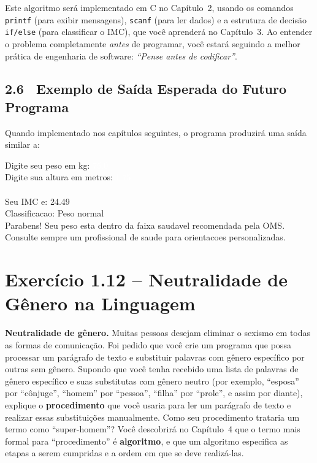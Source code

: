 \documentclass[12pt,a4paper]{article}
\begin{document}
\begin{boaprática}
  Este algoritmo será implementado em C no Capítulo~2, usando os comandos
  \texttt{printf} (para exibir mensagens), \texttt{scanf} (para ler dados) e
  a estrutura de decisão \texttt{if/else} (para classificar o IMC), que você
  aprenderá no Capítulo~3. Ao entender o problema completamente \textit{antes}
  de programar, você estará seguindo a melhor prática de engenharia de software:
  \textit{``Pense antes de codificar''}.
\end{boaprática}

\subsection*{2.6 \ Exemplo de Saída Esperada do Futuro Programa}

Quando implementado nos capítulos seguintes, o programa produzirá uma saída similar a:

\begin{tcolorbox}[colback=black!90, colframe=deitelblue, fontupper=\ttfamily\small\color{green!70}]
Digite seu peso em kg: \textcolor{white}{75.0}\\
Digite sua altura em metros: \textcolor{white}{1.75}\\
\\
Seu IMC e: 24.49\\
Classificacao: Peso normal\\
Parabens! Seu peso esta dentro da faixa saudavel recomendada pela OMS.\\
Consulte sempre um profissional de saude para orientacoes personalizadas.
\end{tcolorbox}

\newpage

\section{Exercício 1.12 -- Neutralidade de Gênero na Linguagem}

\begin{enunciadoBox}[Enunciado]
\textbf{Neutralidade de gênero.} Muitas pessoas desejam eliminar o sexismo em todas
as formas de comunicação. Foi pedido que você crie um programa que possa processar
um parágrafo de texto e substituir palavras com gênero específico por outras sem
gênero. Supondo que você tenha recebido uma lista de palavras de gênero específico
e suas substitutas com gênero neutro (por exemplo, ``esposa'' por ``cônjuge'',
``homem'' por ``pessoa'', ``filha'' por ``prole'', e assim por diante), explique
o \textbf{procedimento} que você usaria para ler um parágrafo de texto e realizar
essas substituições manualmente. Como seu procedimento trataria um termo como
``super-homem''? Você descobrirá no Capítulo~4 que o termo mais formal para
``procedimento'' é \textbf{algoritmo}, e que um algoritmo especifica as etapas a
serem cumpridas e a ordem em que se deve realizá-las.
\end{enunciadoBox}
\end{document}
